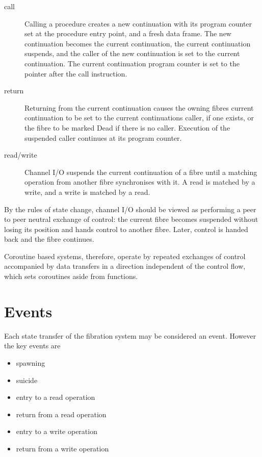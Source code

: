 \documentclass{article}
\begin{document}
\begin{description}
\item[call] Calling a procedure creates a new continuation
with its program counter set at the procedure entry point,
and a fresh data frame. The new continuation becomes the
current continuation, the current continuation suspends,
and the caller of the new continuation is set to the current
continuation. The current continuation program counter is set
to the pointer after the call instruction.

\item[return] Returning from the current continuation causes
the owning fibres current continuation to be set to the
current continuations caller, if one exists, or the 
fibre to be marked Dead if there is no caller. Execution
of the suspended caller continues at its program counter.

\item[read/write] Channel I/O suspends the current continuation
of a fibre until a matching operation from another fibre
synchronises with it. A read is matched by a write, and a write
is matched by a read.
\end{description}

By the rules of state change, channel I/O should be viewed
as performing a peer to peer neutral exchange of control:
the current fibre becomes suspended without losing its position
and hands control to another fibre. Later, control is handed
back and the fibre continues.

Coroutine based systems, therefore, operate by repeated exchanges
of control accompanied by data transfers in a direction independent
of the control flow, which sets coroutines aside from functions.

\section{Events}
Each state transfer of the fibration system may be considered
an event. However the key events are
\begin{itemize}
\item spawning
\item suicide
\item entry to a read operation
\item return from a read operation
\item entry to a write operation
\item return from a write operation
\end{itemize}
\end{document}
